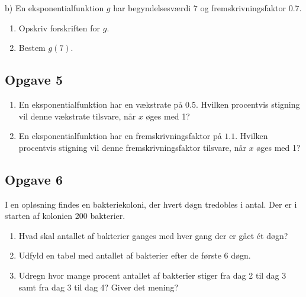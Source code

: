 b) En eksponentialfunktion $g$ har begyndelsesværdi $7$ og fremskrivningsfaktor $0.7$.
\begin{enumerate}[label=\roman*)]
	\item Opskriv forskriften for $g$. 
	\item Bestem $g(7)$. 
\end{enumerate}


\subsection*{Opgave 5}

\begin{enumerate}[label= \roman*)]
	\item En eksponentialfunktion har en vækstrate på 0.5. Hvilken procentvis stigning vil 
	denne vækstrate tilsvare, når $x$ øges med 1?
	\item En eksponentialfunktion har en fremskrivningsfaktor på $1.1$. Hvilken procentvis 
	stigning vil denne fremskrivningsfaktor tilsvare, når $x$ øges med 1?
\end{enumerate}

\subsection*{Opgave 6}

I en opløsning findes en bakteriekoloni, der hvert døgn tredobles i antal. Der er i starten af kolonien 200 bakterier.

\begin{enumerate}[label=\roman*)]
	\item Hvad skal antallet af bakterier ganges med hver gang der er gået ét døgn?
	\item Udfyld en tabel med antallet af bakterier efter de første 6 døgn.
	\item Udregn hvor mange procent antallet af bakterier stiger fra dag 2 til dag 3 samt fra 
	dag 3 til dag 4? Giver det mening?
\end{enumerate} 

\newpage

